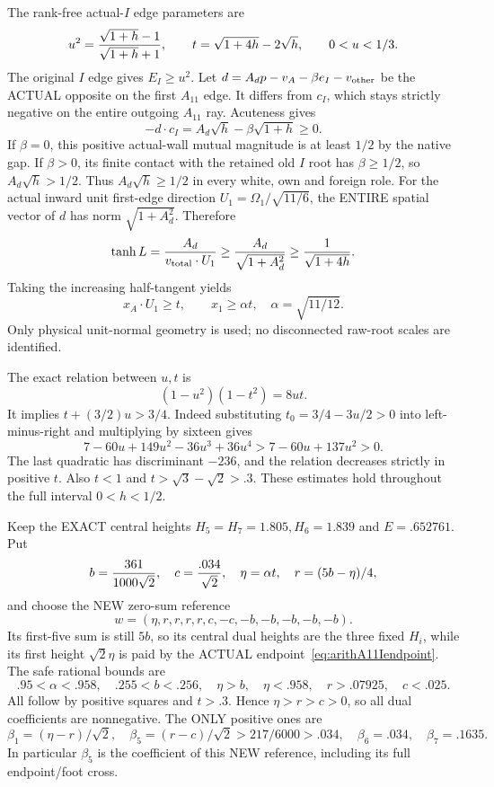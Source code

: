 \documentclass[11pt]{article}
\begin{document}
The rank-free actual-\(I\) edge parameters are
\[
 u^2={\sqrt{1+h}-1\over\sqrt{1+h}+1},\qquad
 t=\sqrt{1+4h}-2\sqrt h,\qquad 0<u<1/3 .
\]
The original \(I\) edge gives \(E_I\ge u^2\).
Let \(d=A_dp-v_A-\beta e_I-v_{\rm other}\)
be the ACTUAL opposite on the first \(A_{11}\)
edge.  It differs from \(c_I\), which stays
strictly negative on the entire outgoing
\(A_{11}\) ray.
Acuteness gives
\[
       -d\cdot c_I=A_d\sqrt h-\beta\sqrt{1+h}\ge0 .
\]
If \(\beta=0\), this positive actual-wall
mutual magnitude is at least \(1/2\)
by the native gap.
If \(\beta>0\), its finite contact with the
retained old \(I\) root has \(\beta\ge1/2\),
so \(A_d\sqrt h>1/2\).
Thus \(A_d\sqrt h\ge1/2\) in every white,
own and foreign role.
For the actual inward unit first-edge direction
\(U_1=\Omega_1/\sqrt{11/6}\), the ENTIRE
spatial vector of \(d\) has norm
\(\sqrt{1+A_d^2}\).
Therefore
\[
 \tanh L={A_d\over v_{\rm total}\cdot U_1}
       \ge {A_d\over\sqrt{1+A_d^2}}
       \ge {1\over\sqrt{1+4h}} .
\]
Taking the increasing half-tangent yields
\[
 x_A\cdot U_1\ge t,\qquad
 x_1\ge\alpha t,\quad\alpha=\sqrt{11/12}.
\tag{A11Iend}\label{eq:arithA11Iendpoint}
\]
Only physical unit-normal geometry is used;
no disconnected raw-root scales are identified.

The exact relation between \(u,t\) is
\[
                    (1-u^2)(1-t^2)=8ut .
\]
It implies \(t+(3/2)u>3/4\).
Indeed substituting \(t_0=3/4-3u/2>0\)
into left-minus-right and multiplying by
sixteen gives
\[
 7-60u+149u^2-36u^3+36u^4
       >7-60u+137u^2>0 .
\]
The last quadratic has discriminant \(-236\),
and the relation decreases strictly in
positive \(t\).
Also \(t<1\) and
\(t>\sqrt3-\sqrt2>.3\).
These estimates hold throughout the full
interval \(0<h<1/2\).

Keep the EXACT central heights
\(H_5=H_7=1.805,H_6=1.839\) and
\(E=.652761\).
Put
\[
 b={361\over1000\sqrt2},\quad
 c={.034\over\sqrt2},\quad
 \eta=\alpha t,\quad r=(5b-\eta)/4,
\]
and choose the NEW zero-sum reference
\[
                  w=(\eta,r,r,r,r,c,-c,-b,-b,-b,-b,-b).
\]
Its first-five sum is still \(5b\), so its
central dual heights are the three fixed
\(H_i\), while its first height
\(\sqrt2\eta\) is paid by the ACTUAL
endpoint~\eqref{eq:arithA11Iendpoint}.
The safe rational bounds are
\[
 .95<\alpha<.958,\quad .255<b<.256,\quad
 \eta>b,\quad\eta<.958,\quad
 r>.07925,\quad c<.025 .
\]
All follow by positive squares and \(t>.3\).
Hence \(\eta>r>c>0\), so all dual coefficients
are nonnegative.  The ONLY positive ones are
\[
 \beta_1=(\eta-r)/\sqrt2,\quad
 \beta_5=(r-c)/\sqrt2>217/6000>.034,\quad
 \beta_6=.034,\quad\beta_7=.1635 .
\]
In particular \(\beta_5\) is the coefficient
of this NEW reference, including its full
endpoint/foot cross.
\end{document}

